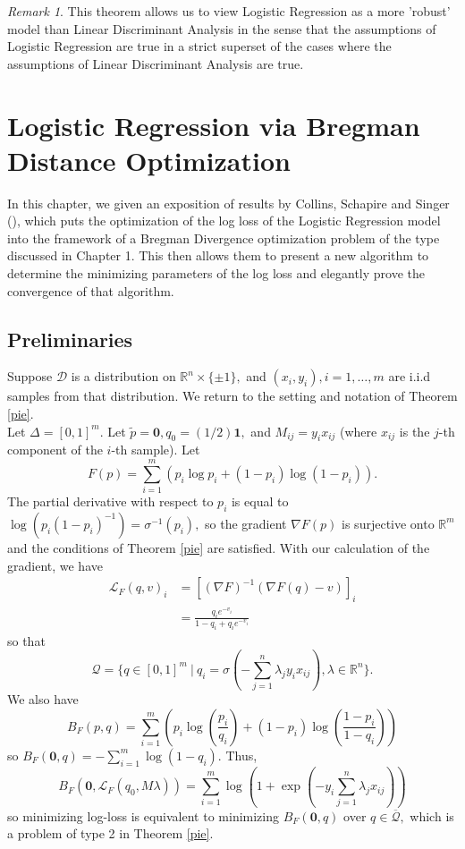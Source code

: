 \documentclass[BSc]{usydthesis}
\numberwithin{equation}{chapter}
\theoremstyle{remark}
\newtheorem{Remark}[equation]{Remark}
\begin{document}
\begin{Remark}
 This theorem allows us to view Logistic Regression as a more 'robust' model than Linear Discriminant Analysis in the sense that the assumptions of Logistic Regression are true in a strict superset of the cases where the assumptions of Linear Discriminant Analysis are true. 
\end{Remark}


\chapter{Logistic Regression via Bregman Distance Optimization}
In this chapter, we given an exposition of results by Collins, Schapire and Singer (\cite{Collins}), which puts the optimization of the log loss of the Logistic Regression model into the framework of a Bregman Divergence optimization problem of the type discussed in Chapter 1. This then allows them to present a new algorithm to determine the minimizing parameters of the log loss and elegantly prove the convergence of that algorithm. 
\section{Preliminaries}

Suppose $\mathcal{D}$ is a distribution on $\mathbb{R}^n \times \{ \pm 1\},$ and $(x_i, y_i), i=1,\ldots, m$ are i.i.d samples from that distribution.
We return to the setting and notation of Theorem \ref{pie}.\\

Let $\Delta = [0,1]^m.$ Let $\tilde{p} = \mathbf{0}, q_0 = (1/2) \mathbf{1},$ and $M_{ij} = y_i x_{ij}$ (where $x_{ij}$ is the $j$-th component of the $i$-th sample). Let $$F(p) = \sum_{i=1}^m \left( p_i \log p_i + (1-p_i) \log(1-p_i) \right).$$ The partial derivative with respect to $p_i$ is equal to $\log(p_i (1-p_i)^{-1}) = \sigma^{-1}(p_i),$ so the gradient $\nabla F(p)$ is surjective onto $\mathbb{R}^m$ and the conditions of Theorem \ref{pie} are satisfied. With our calculation of the gradient, we have 
\begin{align*}
 \mathcal{L}_F(q,v)_i &= [(\nabla F)^{-1} ( \nabla F(q) -v)]_i \\
                      &= \frac{q_i e^{-v_i}}{1-q_i + q_i e^{-v_i}}
\end{align*}
 so that $$\mathcal{Q} = \bigg\{ q\in [0,1]^m \ \bigg| \ q_i = \sigma\left( -\sum_{j=1}^n \lambda_j y_i x_{ij} \right), \lambda \in \mathbb{R}^n \bigg\}.$$ We also have $$ B_F(p,q) = \sum_{i=1}^m \left( p_i \log \left( \frac{p_i}{q_i} \right) + (1-p_i) \log \left( \frac{1-p_i}{1-q_i} \right) \right)$$ so $B_F(\mathbf{0}, q) = -\sum_{i=1}^m \log(1-q_i).$ Thus, $$B_F(\mathbf{0}, \mathcal{L}_F(q_0, M\lambda)) = \sum_{i=1}^m \log\left(1+\exp\left(-y_i\sum_{j=1}^n \lambda_j x_{ij}\right) \right)$$ so minimizing log-loss is equivalent to minimizing $B_F(\mathbf{0}, q)$ over $q\in \overline{\mathcal{Q}},$ which is a problem of type 2 in Theorem \ref{pie}. 
\end{document}
